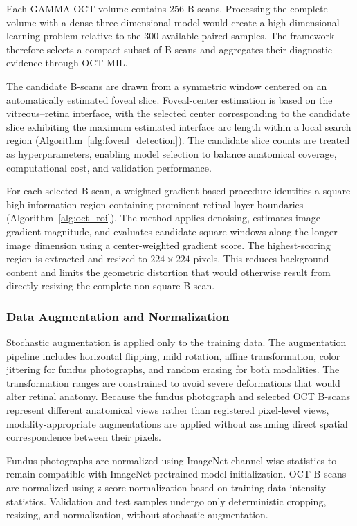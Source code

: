 \documentclass{ieeeaccess}
\begin{document}
Each GAMMA OCT volume contains 256 B-scans. Processing the complete volume with a dense three-dimensional model would create a high-dimensional learning problem relative to the 300 available paired samples. The framework therefore selects a compact subset of B-scans and aggregates their diagnostic evidence through OCT-MIL.

The candidate B-scans are drawn from a symmetric window centered on an automatically estimated foveal slice. Foveal-center estimation is based on the vitreous--retina interface, with the selected center corresponding to the candidate slice exhibiting the maximum estimated interface arc length within a local search region (Algorithm~\ref{alg:foveal_detection}). The candidate slice counts are treated as hyperparameters, enabling model selection to balance anatomical coverage, computational cost, and validation performance.

For each selected B-scan, a weighted gradient-based procedure identifies a square high-information region containing prominent retinal-layer boundaries (Algorithm~\ref{alg:oct_roi}). The method applies denoising, estimates image-gradient magnitude, and evaluates candidate square windows along the longer image dimension using a center-weighted gradient score. The highest-scoring region is extracted and resized to $224\times224$ pixels. This reduces background content and limits the geometric distortion that would otherwise result from directly resizing the complete non-square B-scan.

\subsubsection{Data Augmentation and Normalization}
\label{subsubsec:augmentation_normalization}

Stochastic augmentation is applied only to the training data. The augmentation pipeline includes horizontal flipping, mild rotation, affine transformation, color jittering for fundus photographs, and random erasing for both modalities. The transformation ranges are constrained to avoid severe deformations that would alter retinal anatomy. Because the fundus photograph and selected OCT B-scans represent different anatomical views rather than registered pixel-level views, modality-appropriate augmentations are applied without assuming direct spatial correspondence between their pixels.

Fundus photographs are normalized using ImageNet channel-wise statistics to remain compatible with ImageNet-pretrained model initialization. OCT B-scans are normalized using z-score normalization based on training-data intensity statistics. Validation and test samples undergo only deterministic cropping, resizing, and normalization, without stochastic augmentation.
\end{document}
